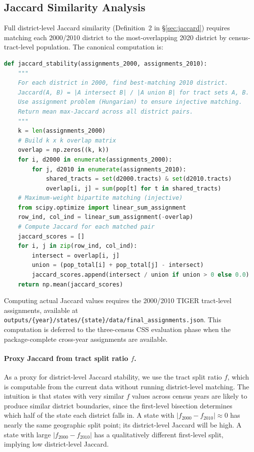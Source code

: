 \subsection{Jaccard Similarity Analysis}
\label{sec:jaccard-analysis}

Full district-level Jaccard similarity (Definition~2 in \S\ref{sec:jaccard})
requires matching each 2000/2010 district to the most-overlapping 2020 district
by census-tract-level population.
The canonical computation is:

\begin{lstlisting}[language=Python, basicstyle=\small\ttfamily, caption={Jaccard stability pseudocode.}]
def jaccard_stability(assignments_2000, assignments_2010):
    """
    For each district in 2000, find best-matching 2010 district.
    Jaccard(A, B) = |A intersect B| / |A union B| for tract sets A, B.
    Use assignment problem (Hungarian) to ensure injective matching.
    Return mean max-Jaccard across all district pairs.
    """
    k = len(assignments_2000)
    # Build k x k overlap matrix
    overlap = np.zeros((k, k))
    for i, d2000 in enumerate(assignments_2000):
        for j, d2010 in enumerate(assignments_2010):
            shared_tracts = set(d2000.tracts) & set(d2010.tracts)
            overlap[i, j] = sum(pop[t] for t in shared_tracts)
    # Maximum-weight bipartite matching (injective)
    from scipy.optimize import linear_sum_assignment
    row_ind, col_ind = linear_sum_assignment(-overlap)
    # Compute Jaccard for each matched pair
    jaccard_scores = []
    for i, j in zip(row_ind, col_ind):
        intersect = overlap[i, j]
        union = (pop_total[i] + pop_total[j] - intersect)
        jaccard_scores.append(intersect / union if union > 0 else 0.0)
    return np.mean(jaccard_scores)
\end{lstlisting}

Computing actual Jaccard values requires the 2000/2010 TIGER tract-level
assignments, available at
\texttt{outputs/\{year\}/states/\{state\}/data/final\_assignments.json}.
This computation is deferred to the three-census CSS evaluation phase when
the package-complete cross-year assignments are available.

\paragraph{Proxy Jaccard from tract split ratio $f$.}
As a proxy for district-level Jaccard stability, we use the tract split
ratio $f$, which is computable from the current data without running
district-level matching.
The intuition is that states with very similar $f$ values across census years
are likely to produce similar district boundaries, since the first-level
bisection determines which half of the state each district falls in.
A state with $|f_{2000} - f_{2010}| \approx 0$ has nearly the same geographic
split point; its district-level Jaccard will be high.
A state with large $|f_{2000} - f_{2010}|$ has a qualitatively different
first-level split, implying low district-level Jaccard.

